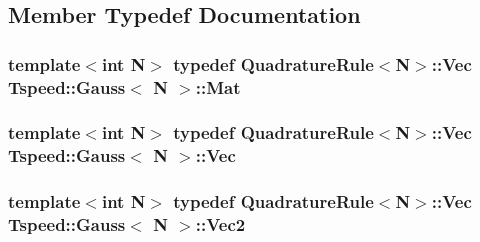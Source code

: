 \subsection{Member Typedef Documentation}
\hypertarget{classTspeed_1_1Gauss_a60a04af13bc0e53cfae47226d1d3e6c2}{
\subsubsection[{Mat}]{\setlength{\rightskip}{0pt plus 5cm}template$<$int N$>$ typedef Quadrature\-Rule$<$N$>$\-::{\bf Vec} {\bf Tspeed\-::\-Gauss}$<$ N $>$\-::Mat}}\label{classTspeed_1_1Gauss_a60a04af13bc0e53cfae47226d1d3e6c2}
\hypertarget{classTspeed_1_1Gauss_aa7e6ce3b329db121166dc94669eeb64c}{
\subsubsection[{Vec}]{\setlength{\rightskip}{0pt plus 5cm}template$<$int N$>$ typedef Quadrature\-Rule$<$N$>$\-::Vec {\bf Tspeed\-::\-Gauss}$<$ N $>$\-::Vec}}\label{classTspeed_1_1Gauss_aa7e6ce3b329db121166dc94669eeb64c}
\hypertarget{classTspeed_1_1Gauss_ae0f9176585d652260498c0b142b183eb}{
\subsubsection[{Vec2}]{\setlength{\rightskip}{0pt plus 5cm}template$<$int N$>$ typedef Quadrature\-Rule$<$N$>$\-::{\bf Vec} {\bf Tspeed\-::\-Gauss}$<$ N $>$\-::Vec2}}\label{classTspeed_1_1Gauss_ae0f9176585d652260498c0b142b183eb}


